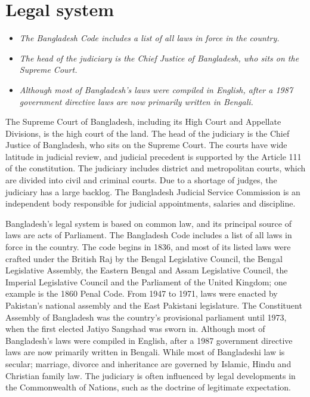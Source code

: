 \section{Legal system}\label{legal-system}

\begin{itemize}
\item
  \emph{The Bangladesh Code includes a list of all laws in force in the
  country.}
\item
  \emph{The head of the judiciary is the Chief Justice of Bangladesh,
  who sits on the Supreme Court.}
\item
  \emph{Although most of Bangladesh's laws were compiled in English,
  after a 1987 government directive laws are now primarily written in
  Bengali.}
\end{itemize}

The Supreme Court of Bangladesh, including its High Court and Appellate
Divisions, is the high court of the land. The head of the judiciary is
the Chief Justice of Bangladesh, who sits on the Supreme Court. The
courts have wide latitude in judicial review, and judicial precedent is
supported by the Article 111 of the constitution. The judiciary includes
district and metropolitan courts, which are divided into civil and
criminal courts. Due to a shortage of judges, the judiciary has a large
backlog. The Bangladesh Judicial Service Commission is an independent
body responsible for judicial appointments, salaries and discipline.

Bangladesh's legal system is based on common law, and its principal
source of laws are acts of Parliament. The Bangladesh Code includes a
list of all laws in force in the country. The code begins in 1836, and
most of its listed laws were crafted under the British Raj by the Bengal
Legislative Council, the Bengal Legislative Assembly, the Eastern Bengal
and Assam Legislative Council, the Imperial Legislative Council and the
Parliament of the United Kingdom; one example is the 1860 Penal Code.
From 1947 to 1971, laws were enacted by Pakistan's national assembly and
the East Pakistani legislature. The Constituent Assembly of Bangladesh
was the country's provisional parliament until 1973, when the first
elected Jatiyo Sangshad was sworn in. Although most of Bangladesh's laws
were compiled in English, after a 1987 government directive laws are now
primarily written in Bengali. While most of Bangladeshi law is secular;
marriage, divorce and inheritance are governed by Islamic, Hindu and
Christian family law. The judiciary is often influenced by legal
developments in the Commonwealth of Nations, such as the doctrine of
legitimate expectation.

